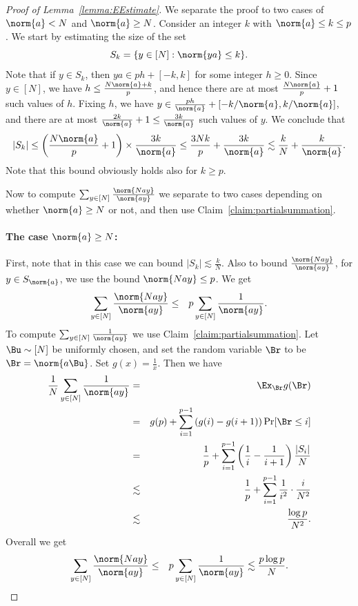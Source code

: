\begin{proof}[Proof of Lemma~\ref{lemma:EEstimate}]
We separate the proof to two cases of $\norm{a} < N$ and $\norm{a} \geq N$.
Consider an integer $k$ with   $\norm{a} \le k \le p$. We start by  estimating the size of the set
$$S_k=\{y \in [N] : \norm{ya} \le k\}.$$
Note that if $y \in S_k$, then $y a  \in p h + [-k,k]$ for some integer $h \ge 0$. Since $y \in [N]$,  we have
$h \le \frac{N\norm{a}+k}{p}$,
and hence there are at most $\frac{N\norm{a}}{p}+1$ such values of $h$. Fixing $h$, we have $y \in \frac{ph}{\norm{a}} + [-k/\norm{a}, k/\norm{a}]$, and there are at most $\frac{2k}{\norm{a}}+1 \le \frac{3k}{\norm{a}}$ such values of $y$. We conclude that
\begin{equation*}
|S_k| \le  \left(\frac{N\norm{a}}{p}+1\right) \times \frac{3k}{\norm{a}}  \le \frac{3Nk}{p} +  \frac{3k}{\norm{a}}\lesssim \frac{k}{N} + \frac{k}{\norm{a}}.
\end{equation*}
Note that this bound obviously  holds  also for $k \ge p$.




%
%
%
%
%
%
%
%
%
%
%
%
%
%
%
%
%

Now to compute $\sum_{y \in [N]} \frac{\norm{Nay}}{\norm{ay}}$ we separate to two cases depending on whether $\norm{a}\geq N$ or not, and then use Claim~\ref{claim:partialsummation}.

\paragraph{The case $ \norm{a} \ge N$:}

First, note that in this case we can bound  $|S_k| \lesssim \frac{k}{N}$. Also to bound $\frac{\norm{Nay}}{\norm{ay}}$,
	 for $y\in S_{\norm{a}}$, we use the bound $\norm{Nay}\leq p$.
 We get
\begin{eqnarray*}
	\sum_{y \in [N]} \frac{\norm{Nay}}{\norm{ay}}
	&\leq&   p\sum_{y \in [N]} \frac{1}{\norm{ay}}.
	\end{eqnarray*}
	To compute $\sum_{y \in [N]} \frac{1}{\norm{ay}}$ we use Claim~\ref{claim:partialsummation}. Let $\Bu \sim [N]$ be uniformly chosen, and set the random variable $\Br$ to be $\Br = \norm{a\Bu}$. Set $g(x) = \frac{1}{x}$. Then we have
	\begin{eqnarray*}
\frac{1}{N}	\sum_{y \in [N]} \frac{1}{\norm{ay}}
        &=& \Ex_{\Br} g(\Br) \\
		&=& g(p)+ \sum_{i=1}^{p-1} \left(g(i)-g(i+1)\right) \Pr[\Br \leq i]\\
		&=& \frac{1}{p} + \sum_{i=1}^{p-1} \left(\frac{1}{i}-\frac{1}{i+1}\right) \frac{|S_i|}{N}\\
		&\lesssim& \frac{1}{p} + \sum_{i=1}^{p-1} \frac{1}{i^2} \cdot \frac{i}{N^2}\\
		&\lesssim&\frac{\log p}{N^2}.
  \end{eqnarray*}
Overall we get
\begin{eqnarray*}
	\sum_{y \in [N]} \frac{\norm{Nay}}{\norm{ay}}
	&\leq& p\sum_{y \in [N]} \frac{1}{\norm{ay}}\lesssim \frac{p\log p}{N} .
	\end{eqnarray*}

\end{proof}
